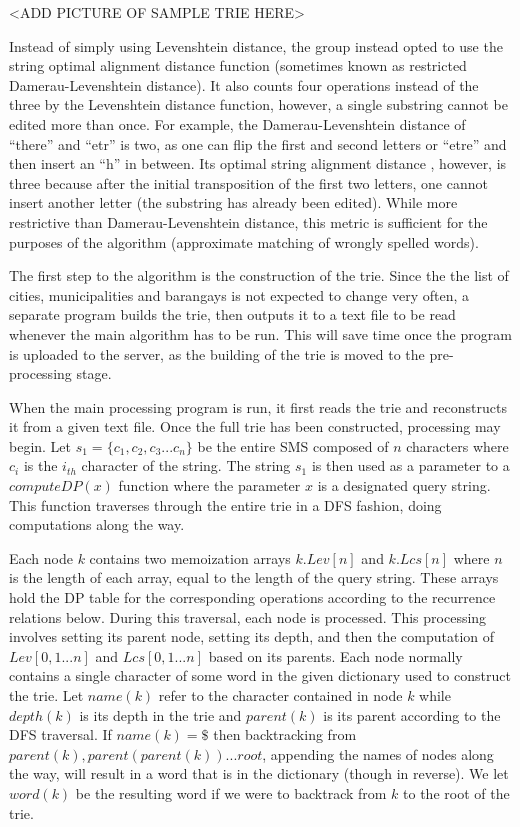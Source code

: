 \documentclass{acm_proc_article-sp}
\begin{document}
<ADD PICTURE OF SAMPLE TRIE HERE> 

Instead of simply using Levenshtein distance, the group instead opted to use the string optimal alignment distance function (sometimes known as restricted Damerau-Levenshtein distance). It also counts four operations instead of the three by the Levenshtein distance function, however, a single substring cannot be edited more than once. For example, the Damerau-Levenshtein distance of ``there'' and ``etr'' is two, as one can flip the first and second letters or ``etre'' and then insert an ``h'' in between. Its optimal string alignment distance , however, is three because after the initial transposition of the first two letters, one cannot insert another letter (the substring has already been edited). While more restrictive than Damerau-Levenshtein distance, this metric is sufficient for the purposes of the algorithm (approximate matching of wrongly spelled words). 

The first step to the algorithm is the construction of the trie. Since the the list of cities, municipalities and barangays is not expected to change very often, a separate program builds the trie, then outputs it to a text file to be read whenever the main algorithm has to be run. This will save time once the program is uploaded to the server, as  the building of the trie is moved to the pre-processing stage.

When the main processing program is run, it first reads the trie and reconstructs it from a given text file. Once the full trie has been constructed, processing may begin. Let $s_1 = \{c_1,c_2,c_3 . . . c_n\}$ be the entire SMS composed of $n$ characters where $c_i$ is the $i_{th}$ character of the string. The string $s_1$ is then used as a parameter to a $computeDP(x)$ function where the parameter $x$ is a designated query string. This function traverses through the entire trie in a DFS fashion, doing computations along the way. 
 
Each node $k$ contains two memoization arrays $k.Lev[n]$ and $k.Lcs[n]$ where $n$ is the length of each array, equal to the length of the query string. These arrays hold the DP table for the corresponding operations according to the recurrence relations below. During this traversal, each node is processed. This processing involves setting its parent node, setting its depth, and then the computation of $Lev[0,1. . . n]$ and $Lcs[0,1. . . n]$ based on its parents. Each node normally contains a single character of some word in the given dictionary used to construct the trie. Let $name(k)$ refer to the character contained in node $k$ while $depth(k)$ is its depth in the trie and $parent(k)$ is its parent according to the DFS traversal. If $name(k) = \$$ then backtracking from $parent(k), parent(parent(k)) . . . root$, appending the names of nodes along the way, will result in a word that is in the dictionary (though in reverse). We let $word(k)$ be the resulting word if we were to backtrack from $k$ to the root of the trie. 
\end{document}
